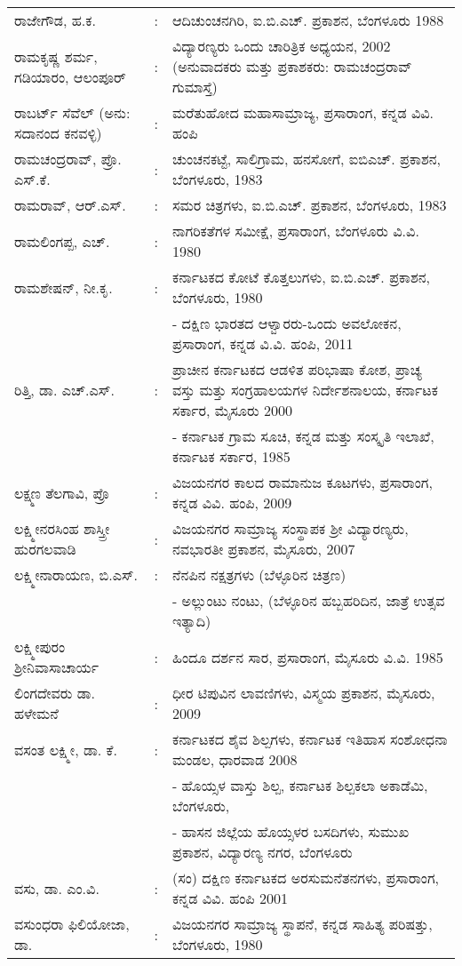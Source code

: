 \begin{longtable}[l]{@{}>{\raggedright}p{4.7cm}cp{9.2cm}<{\raggedright}@{}}
ರಾಜೇಗೌಡ, ಹ.ಕ. & : &  ಆದಿಚುಂಚನಗಿರಿ, ಐ.ಬಿ.ಎಚ್​. ಪ್ರಕಾಶನ, ಬೆಂಗಳೂರು 1988\\
ರಾಮಕೃಷ್ಣ ಶರ್ಮ, ಗಡಿಯಾರಂ, ಆಲಂಪೂರ್​ & : &  ವಿದ್ಯಾರಣ್ಯರು ಒಂದು ಚಾರಿತ್ರಿಕ ಅಧ್ಯಯನ, 2002 (ಅನುವಾದಕರು ಮತ್ತು ಪ್ರಕಾಶಕರು: ರಾಮಚಂದ್ರರಾವ್​ ಗುಮಾಸ್ತೆ)\\
ರಾಬರ್ಟ್ ಸೆವೆಲ್​ (ಅನು: ಸದಾನಂದ ಕನವಳ್ಳಿ) & : & ಮರೆತುಹೋದ ಮಹಾಸಾಮ್ರಾಜ್ಯ, ಪ್ರಸಾರಾಂಗ, ಕನ್ನಡ ವಿವಿ. ಹಂಪಿ\\
ರಾಮಚಂದ್ರರಾವ್​, ಪ್ರೊ. ಎಸ್​.ಕೆ. & : & ಚುಂಚನಕಟ್ಟೆ, ಸಾಲಿಗ್ರಾಮ, ಹನಸೋಗೆ, ಐಬಿಎಚ್​. ಪ್ರಕಾಶನ, ಬೆಂಗಳೂರು, 1983\\
ರಾಮರಾವ್​, ಆರ್​.ಎಸ್​. & : & ಸಮರ ಚಿತ್ರಗಳು, ಐ.ಬಿ.ಎಚ್​. ಪ್ರಕಾಶನ, ಬೆಂಗಳೂರು, 1983\\
ರಾಮಲಿಂಗಪ್ಪ, ಎಚ್​. & : & ನಾಗರಿಕತೆಗಳ ಸಮೀಕ್ಷೆ, ಪ್ರಸಾರಾಂಗ, ಬೆಂಗಳೂರು ವಿ.ವಿ. 1980\\
ರಾಮಶೇಷನ್​, ನೀ.ಕೃ. & : & ಕರ್ನಾಟಕದ ಕೋಟೆ ಕೊತ್ತಲುಗಳು, ಐ.ಬಿ.ಎಚ್​. ಪ್ರಕಾಶನ, ಬೆಂಗಳೂರು, 1980\\
&& - ದಕ್ಷಿಣ ಭಾರತದ ಆಳ್ವಾರರು-ಒಂದು ಅವಲೋಕನ, ಪ್ರಸಾರಾಂಗ, ಕನ್ನಡ ವಿ.ವಿ. ಹಂಪಿ, 2011\\
ರಿತ್ತಿ, ಡಾ. ಎಚ್​.ಎಸ್​. & : &  ಪ್ರಾಚೀನ ಕರ್ನಾಟಕದ ಆಡಳಿತ ಪರಿಭಾಷಾ ಕೋಶ, ಪ್ರಾಚ್ಯ ವಸ್ತು ಮತ್ತು ಸಂಗ್ರಹಾಲಯಗಳ ನಿರ್ದೇಶನಾಲಯ, ಕರ್ನಾಟಕ ಸರ್ಕಾರ, ಮೈಸೂರು 2000\\
&& - ಕರ್ನಾಟಕ ಗ್ರಾಮ ಸೂಚಿ, ಕನ್ನಡ ಮತ್ತು ಸಂಸ್ಕೃತಿ ಇಲಾಖೆ, ಕರ್ನಾಟಕ ಸರ್ಕಾರ, 1985\\
ಲಕ್ಷ್ಮಣ ತೆಲಗಾವಿ, ಪ್ರೊ & : &  ವಿಜಯನಗರ ಕಾಲದ ರಾಮಾನುಜ ಕೂಟಗಳು, ಪ್ರಸಾರಾಂಗ, ಕನ್ನಡ ವಿವಿ. ಹಂಪಿ, 2009\\
ಲಕ್ಷ್ಮೀನರಸಿಂಹ ಶಾಸ್ತ್ರೀ ಹುರಗಲವಾಡಿ & : &  ವಿಜಯನಗರ ಸಾಮ್ರಾಜ್ಯ ಸಂಸ್ಥಾಪಕ ಶ‍್ರೀ ವಿದ್ಯಾರಣ್ಯರು, ನವಭಾರತೀ ಪ್ರಕಾಶನ, ಮೈಸೂರು, 2007\\
ಲಕ್ಷ್ಮೀನಾರಾಯಣ, ಬಿ.ಎಸ್​. & : & ನೆನಪಿನ ನಕ್ಷತ್ರಗಳು (ಬೆಳ್ಳೂರಿನ ಚಿತ್ರಣ)\\
&& - ಅಲ್ಲುಂಟು ನಂಟು, (ಬೆಳ್ಳೂರಿನ ಹಬ್ಬಹರಿದಿನ, ಜಾತ್ರೆ ಉತ್ಸವ ಇತ್ಯಾದಿ) \\
ಲಕ್ಷ್ಮೀಪುರಂ ಶ‍್ರೀನಿವಾಸಾಚಾರ್ಯ & : &  ಹಿಂದೂ ದರ್ಶನ ಸಾರ, ಪ್ರಸಾರಾಂಗ, ಮೈಸೂರು ವಿ.ವಿ. 1985\\
ಲಿಂಗದೇವರು ಡಾ. ಹಳೇಮನೆ & : & ಧೀರ ಟಿಪುವಿನ ಲಾವಣಿಗಳು, ವಿಸ್ಮಯ ಪ್ರಕಾಶನ, ಮೈಸೂರು, 2009\\
ವಸಂತ ಲಕ್ಷ್ಮೀ, ಡಾ. ಕೆ. & : & ಕರ್ನಾಟಕದ ಶೈವ ಶಿಲ್ಪಗಳು, ಕರ್ನಾಟಕ ಇತಿಹಾಸ ಸಂಶೋಧನಾ ಮಂಡಲ, ಧಾರವಾಡ 2008\\
&& - ಹೊಯ್ಸಳ ವಾಸ್ತು ಶಿಲ್ಪ, ಕರ್ನಾಟಕ ಶಿಲ್ಪಕಲಾ ಅಕಾಡೆಮಿ, ಬೆಂಗಳೂರು, \\
&& - ಹಾಸನ ಜಿಲ್ಲೆಯ ಹೊಯ್ಸಳರ ಬಸದಿಗಳು, ಸುಮುಖ ಪ್ರಕಾಶನ, ವಿದ್ಯಾರಣ್ಯ ನಗರ, ಬೆಂಗಳೂರು\\
ವಸು, ಡಾ. ಎಂ.ವಿ. & : & (ಸಂ) ದಕ್ಷಿಣ ಕರ್ನಾಟಕದ ಅರಸುಮನೆತನಗಳು, ಪ್ರಸಾರಾಂಗ, ಕನ್ನಡ ವಿವಿ. ಹಂಪಿ 2001\\
ವಸುಂಧರಾ ಫಿಲಿಯೋಜಾ, ಡಾ. & : & ವಿಜಯನಗರ ಸಾಮ್ರಾಜ್ಯ ಸ್ಥಾಪನೆ, ಕನ್ನಡ ಸಾಹಿತ್ಯ ಪರಿಷತ್ತು, ಬೆಂಗಳೂರು, 1980\\

\end{longtable}
